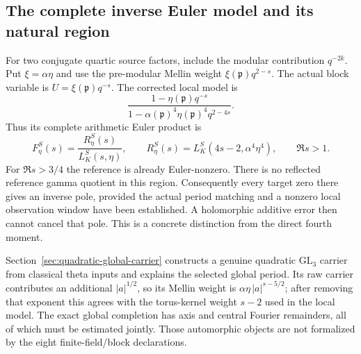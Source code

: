\documentclass[11pt]{article}
\newcommand{\GL}{\mathrm{GL}}
\begin{document}
\subsection{The complete inverse Euler model and its natural region}
For two conjugate quartic source factors, include the modular contribution
$q^{-2k}$. Put $\xi=\alpha\eta$ and use the pre-modular Mellin weight
$\xi(\mathfrak p)q^{2-s}$. The actual block variable is
$U=\xi(\mathfrak p)q^{-s}$. The corrected local model is
\[
 \frac{1-\eta(\mathfrak p)q^{-s}}
      {1-\alpha(\mathfrak p)^4\eta(\mathfrak p)^4q^{2-4s}}.
\]
Thus its complete arithmetic Euler product is
\begin{equation}\label{eq:quartic-weil-euler}
 F_\eta^S(s)=\frac{R_\eta^S(s)}{L_K^S(s,\eta)},\qquad
 R_\eta^S(s)=L_K^S(4s-2,\alpha^4\eta^4),\qquad \Re s>1.
\end{equation}
For $\Re s>3/4$ the reference is already Euler-nonzero.
There is no reflected reference gamma quotient in this region.
Consequently every target zero there gives an inverse pole, provided
the actual period matching and a nonzero local observation window
have been established. A holomorphic additive error then cannot cancel
that pole. This is a concrete distinction from the direct fourth moment.

Section~\ref{sec:quadratic-global-carrier} constructs a genuine
quadratic $\GL_3$ carrier from classical theta inputs and explains
the selected global period. Its raw carrier contributes an additional
$|a|^{1/2}$, so its Mellin weight is
$\alpha\eta\,|a|^{s-5/2}$; after removing that exponent this agrees
with the torus-kernel weight $s-2$ used in the local model.
The exact global completion has axis and central Fourier remainders,
all of which must be estimated jointly. Those automorphic objects
are not formalized by the eight finite-field/block declarations.
\end{document}
